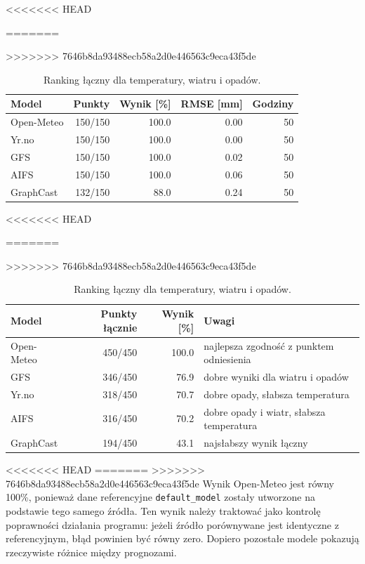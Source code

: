 \documentclass[a4paper,12pt]{article}
\begin{document}
\begin{table}[h]
\begin{table}[h]
<<<<<<< HEAD
\begin{table}[h]
=======
\begin{table}[!h]
>>>>>>> 7646b8da93488ecb58a2d0e446563c9eca43f5de
\centering
\begin{tabular}{lrrrr}
\toprule
Model & Punkty & Wynik [\%] & RMSE [mm] & Godziny \\
\midrule
Open-Meteo & 150/150 & 100.0 & 0.00 & 50 \\
Yr.no & 150/150 & 100.0 & 0.00 & 50 \\
GFS & 150/150 & 100.0 & 0.02 & 50 \\
AIFS & 150/150 & 100.0 & 0.06 & 50 \\
GraphCast & 132/150 & 88.0 & 0.24 & 50 \\
\bottomrule
\end{tabular}
\caption{Ranking modeli dla opadów.}
\end{table}

<<<<<<< HEAD
\begin{table}[h]
=======
\begin{table}[h!]
>>>>>>> 7646b8da93488ecb58a2d0e446563c9eca43f5de
\centering
\small
\begin{tabular}{lrrp{6cm}}
\toprule
Model & Punkty łącznie & Wynik [\%] & Uwagi \\
\midrule
Open-Meteo & 450/450 & 100.0 & najlepsza zgodność z punktem odniesienia \\
GFS & 346/450 & 76.9 & dobre wyniki dla wiatru i opadów \\
Yr.no & 318/450 & 70.7 & dobre opady, słabsza temperatura \\
AIFS & 316/450 & 70.2 & dobre opady i wiatr, słabsza temperatura \\
GraphCast & 194/450 & 43.1 & najsłabszy wynik łączny \\
\bottomrule
\end{tabular}
\caption{Ranking łączny dla temperatury, wiatru i opadów.}
\end{table}

<<<<<<< HEAD
=======
\noindent
>>>>>>> 7646b8da93488ecb58a2d0e446563c9eca43f5de
Wynik Open-Meteo jest równy 100\%, ponieważ dane referencyjne
\texttt{default\_model} zostały utworzone na podstawie tego samego źródła.
Ten wynik należy traktować jako kontrolę poprawności działania programu:
jeżeli źródło porównywane jest identyczne z referencyjnym, błąd powinien być
równy zero. Dopiero pozostałe modele pokazują rzeczywiste różnice między
prognozami.


\end{table}
\end{table}
\end{table}
\end{table}
\end{document}
